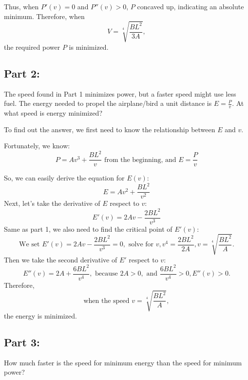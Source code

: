 \documentclass{article}
\begin{document}
Thus, when \( P'(v) = 0 \) and \( P''(v) > 0 \), \( P \) concaved up, indicating an absolute minimum. Therefore, when
\[
V = \sqrt[4]{\frac{BL^2}{3A}},
\]
the required power \( P \) is minimized.

\subsection*{Part 2:}
The speed found in Part 1 minimizes power, but a faster speed might use less fuel. The energy needed to propel the airplane/bird a unit distance is \( E = \frac{P}{v} \). At what speed is energy minimized?

To find out the answer, we first need to know the relationship between \( E \) and \( v \). 

Fortunately, we know:
\[
P = Av^3 + \frac{BL^2}{v} \text{ from the beginning, and }
E = \frac{P}{v}
\]

So, we can easily derive the equation for \( E(v) \):
\[
E = Av^2 + \frac{BL^2}{v^2}
\]
Next, let's take the derivative of \(E\) respect to \(v\):
\[
E'(v) = 2Av-\frac{2BL^2}{v^3}
\]
Same as part 1, we also need to find the critical point of \(E'(v)\):
\[\text{We set } E'(v) = 2Av-\frac{2BL^2}{v^3} = 0,\text{ solve for }v, v^4=\frac{2BL^2}{2A}, v = \sqrt[4]{\frac{BL^2}{A}}\text{.}\]
Then we take the second derivative of \(E'\) respect to \(v\):
\[E''(v) = 2A + \frac{6BL^2}{v^4},
\text{ because } 2A > 0, \text{ and } \frac{6BL^2}{v^4} > 0, E''(v) > 0.\]
Therefore, \[\text{when the speed }v = \sqrt[4]{\frac{BL^2}{A}},\] the energy is minimized.

\subsection*{Part 3:}
How much faster is the speed for minimum energy than the speed for minimum power?
\end{document}
